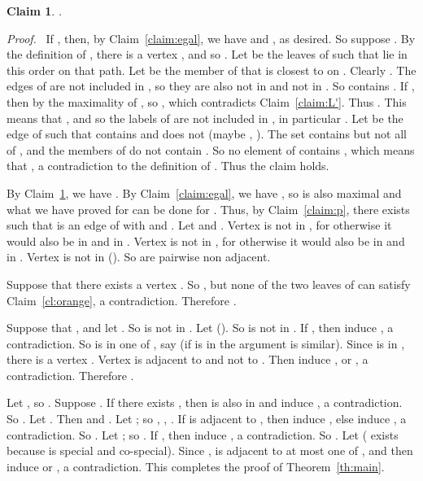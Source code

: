\documentclass[11pt]{article}
\newtheorem{claim}{Claim}
\newenvironment{proofcl}{\noindent \emph{Proof.}\ }{Thus the claim
holds.  \hfill \vspace{1em}}
\begin{document}
\begin{claim}
\label{claim:W}
.
\end{claim}

\begin{proofcl}
If , then, by Claim~\ref{claim:egal}, we have
 and , as desired.  So suppose .  By the definition of , there is a vertex , and so .  Let  be the leaves of
 such that  lie in this order on that path.
Let  be the member of  that is closest to  on
.  Clearly .  The edges of  are not
included in , so they are also not in  and not in .
So  contains .  If , then 
by the maximality of , so , which contradicts
Claim~\ref{claim:L'}.  Thus .  This means that
, and so the labels of  are
not included in , in particular .  Let
 be the edge of  such that  contains  and 
does not (maybe , ).  The set  contains  but not
all of , and the members of  do not contain .  So no element of  contains , which means that , a contradiction to the definition of .
\end{proofcl}



By Claim~\ref{claim:W}, we have .  By
Claim~\ref{claim:egal}, we have , so  is also maximal
and what we have proved for  can be done for .  Thus, by
Claim~\ref{claim:p}, there exists  such that  is an
edge of  with  and .  Let  and .
Vertex  is not in , for otherwise it would also be in 
and in .  Vertex  is not in , for otherwise it would
also be in  and in .  Vertex  is not in  ().
So  are pairwise non adjacent.

Suppose that there exists a vertex .
So , but none of the two leaves of  can satisfy
Claim~\ref{cl:orange}, a contradiction.  Therefore .

Suppose that , and let .  So 
is not in .  Let  ().  So  is not in
.  If , then 
induce , a contradiction.  So  is in one of , say  (if  is in  the argument is similar).
Since  is in , there is a vertex .  Vertex  is adjacent to  and not to .
Then  induce ,  or ,
a contradiction.  Therefore .

Let , so .  Suppose .  If there
exists , then  is also in  and  induce , a contradiction.  So .
Let .  Then  and .  Let ; so , , .  If  is adjacent to
, then  induce , else  induce , a contradiction.  So .
Let ; so .  If , then  induce , a contradiction.  So .  Let
 ( exists because  is special and
co-special).  Since ,  is adjacent to at most
one of , and then  induce  or
, a contradiction.  This completes the proof of
Theorem~\ref{th:main}.  \hfill 
\end{document}
